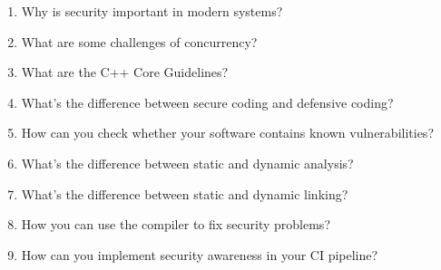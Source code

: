 \begin{enumerate}
\item
Why is security important in modern systems?

\item
What are some challenges of concurrency?

\item
What are the C++ Core Guidelines?

\item
What's the difference between secure coding and defensive coding?

\item
How can you check whether your software contains known vulnerabilities?

\item
What's the difference between static and dynamic analysis?

\item
What's the difference between static and dynamic linking?

\item
How you can use the compiler to fix security problems?

\item
How can you implement security awareness in your CI pipeline?
\end{enumerate}